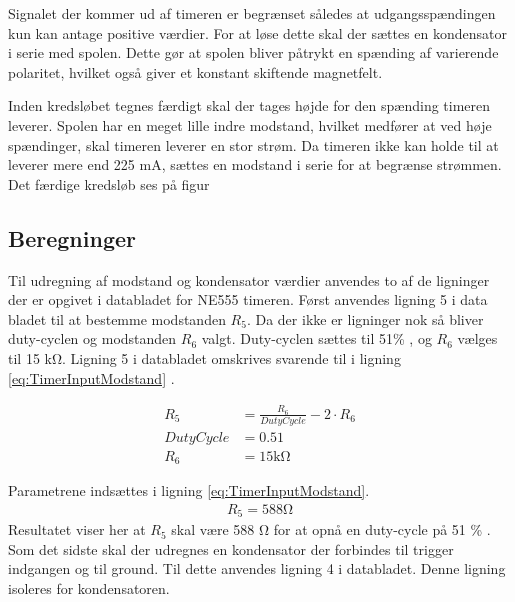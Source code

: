 Signalet der kommer ud af timeren er begrænset således at udgangsspændingen kun kan antage positive værdier.
For at løse dette skal der sættes en kondensator i serie med spolen.
Dette gør at spolen bliver påtrykt en spænding af varierende polaritet, hvilket også giver et konstant skiftende magnetfelt.

Inden kredsløbet tegnes færdigt skal der tages højde for den spænding timeren leverer. 
Spolen har en meget lille indre modstand, hvilket medfører at ved høje spændinger, skal timeren leverer en stor strøm. 
Da timeren ikke kan holde til at leverer mere end 225 \si{\milli\ampere}, sættes en modstand i serie for at begrænse strømmen. 
Det færdige kredsløb ses på figur 

\subsection{Beregninger}
Til udregning af modstand og kondensator værdier anvendes to af de ligninger der er opgivet i databladet for NE555 timeren. 
Først anvendes ligning 5 i data bladet til at bestemme modstanden $R_5$. 
Da der ikke er ligninger nok så bliver duty-cyclen og modstanden $R_6$ valgt. 
Duty-cyclen sættes til 51\%  , og $R_6$ vælges til 15 \si{\kilo\ohm}. 
Ligning 5 i databladet omskrives svarende til i ligning \ref{eq:TimerInputModstand} .

\begin{align}
R_5 & = \frac{R_6}{DutyCycle} - 2 \cdot R_6 \label{eq:TimerInputModstand} \\
DutyCycle & = 0.51 \nonumber \\
R_6 & = 15 \si{\kilo \ohm} \nonumber
\end{align}

Parametrene indsættes i ligning \ref{eq:TimerInputModstand}.
\begin{align}
R_5 = 588 \si{\ohm} \label{eq:InputBeregnet}
\end{align}
Resultatet viser her at $R_5$ skal være 588 \si{\ohm}  for at opnå en duty-cycle på 51 \% .
Som det sidste skal der udregnes en kondensator der forbindes til trigger indgangen og til ground. 
Til dette anvendes ligning 4 i databladet. Denne ligning isoleres for kondensatoren.

